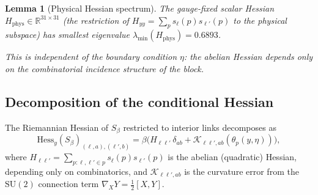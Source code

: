 \documentclass[11pt,a4paper]{article}
\theoremstyle{plain}
\newtheorem{lemma}[theorem]{Lemma}
\theoremstyle{definition}
\theoremstyle{remark}
\newcommand{\R}{\mathbb{R}}
\newcommand{\SU}{\mathrm{SU}}
\newcommand{\Hess}{\mathrm{Hess}}
\newcommand{\cK}{\mathcal{K}}
\begin{document}
\begin{lemma}[Physical Hessian spectrum]\label{lem:phys-spectrum}
The gauge-fixed scalar Hessian $H_{\mathrm{phys}} \in \R^{31 \times 31}$
(the restriction of $H_{yy} = \sum_{p} s_\ell(p)s_{\ell'}(p)$ to the
physical subspace) has smallest eigenvalue
$\lambda_{\min}(H_{\mathrm{phys}}) = 0.6893$.

This is independent of the boundary condition $\eta$: the abelian
Hessian depends only on the combinatorial incidence structure of the block.
\end{lemma}


\subsection{Decomposition of the conditional Hessian}

The Riemannian Hessian of $S_\beta$ restricted to interior links
decomposes as
\begin{equation}\label{eq:hess-decomp}
\Hess_y(S_\beta)_{(\ell,a),(\ell',b)}
= \beta\bigl(H_{\ell\ell'}\,\delta_{ab}
+ \cK_{\ell\ell',ab}(\theta_p(y,\eta))\bigr),
\end{equation}
where $H_{\ell\ell'} = \sum_{p:\ell,\ell'\in p} s_\ell(p)s_{\ell'}(p)$
is the abelian (quadratic) Hessian, depending only on combinatorics, and
$\cK_{\ell\ell',ab}$ is the curvature error from the $\SU(2)$
connection term $\nabla_X Y = \frac{1}{2}[X,Y]$.
\end{document}
